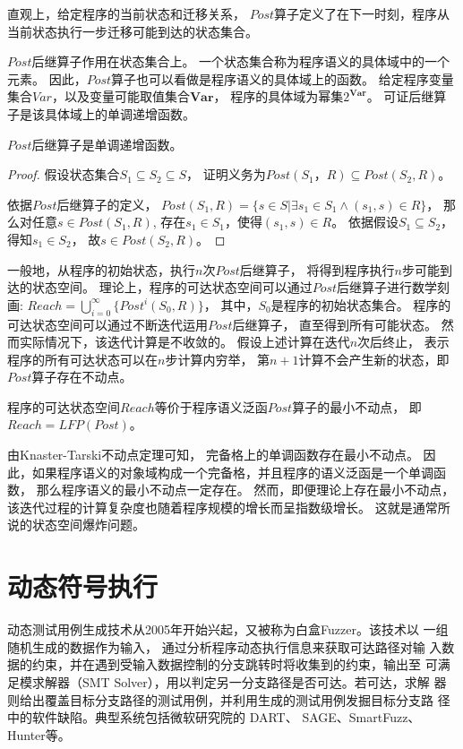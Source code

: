 直观上，给定程序的当前状态和迁移关系，
$Post$算子定义了在下一时刻，程序从当前状态执行一步迁移可能到达的状态集合。

$Post$后继算子作用在状态集合上。
一个状态集合称为程序语义的具体域中的一个元素。
因此，$Post$算子也可以看做是程序语义的具体域上的函数。
给定程序变量集合$Var$，以及变量可能取值集合$\textbf{Var}$，
程序的具体域为幂集$2^{\textbf{Var}}$。
可证后继算子是该具体域上的单调递增函数。

\begin{lemma}
$Post$后继算子是单调递增函数。
\end{lemma}

\begin{proof}
	假设状态集合$S_1 \subseteq S_2 \subseteq S$，
	证明义务为$Post(S_1， R) \subseteq Post(S_2,R)$。
	
	依据$Post$后继算子的定义，
	$Post(S_1, R) = \{ s\in S | \exists s_1 \in S_1 \wedge (s_1, s)\in R \}$，
	那么对任意$s\in Post(S_1, R)$,
	存在$s_1\in S_1$，使得$(s_1, s)\in R$。
	依据假设$S_1 \subseteq S_2$，得知$s_1 \in S_2$，
	故$s\in Post(S_2, R)$。
\end{proof}


一般地，从程序的初始状态，执行$n$次$Post$后继算子，
将得到程序执行$n$步可能到达的状态空间。
理论上，程序的可达状态空间可以通过$Post$后继算子进行数学刻画:
$Reach = \bigcup_{i=0}^{\infty}\{Post^{i}(S_0, R)\}$，
其中，$S_0$是程序的初始状态集合。
程序的可达状态空间可以通过不断迭代运用$Post$后继算子，
直至得到所有可能状态。
然而实际情况下，该迭代计算是不收敛的。
假设上述计算在迭代$n$次后终止，
表示程序的所有可达状态可以在$n$步计算内穷举，
第$n+1$计算不会产生新的状态，即$Post$算子存在不动点。


\begin{lemma}
程序的可达状态空间$Reach$等价于程序语义泛函$Post$算子的最小不动点，
即$Reach = LFP(Post)$。
\end{lemma}

由Knaster-Tarski不动点定理可知，	完备格上的单调函数存在最小不动点。
因此，如果程序语义的对象域构成一个完备格，并且程序的语义泛函是一个单调函数，
那么程序语义的最小不动点一定存在。
然而，即便理论上存在最小不动点，
该迭代过程的计算复杂度也随着程序规模的增长而呈指数级增长。
这就是通常所说的状态空间爆炸问题。

\section{动态符号执行}
动态测试用例生成技术从2005年开始兴起，又被称为白盒Fuzzer。该技术以
一组随机生成的数据作为输入， 通过分析程序动态执行信息来获取可达路径对输
入数据的约束，并在遇到受输入数据控制的分支跳转时将收集到的约束，输出至
可满足模求解器（SMT Solver），用以判定另一分支路径是否可达。若可达，求解
器则给出覆盖目标分支路径的测试用例，并利用生成的测试用例发掘目标分支路
径中的软件缺陷。典型系统包括微软研究院的 DART、 SAGE、SmartFuzz、 Hunter等。


